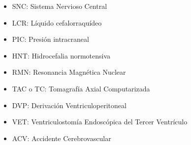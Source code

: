 \begin{itemize}
    \item SNC: Sistema Nervioso Central
    \item LCR: Líquido cefalorraquídeo
    \item PIC: Presión intracraneal
    \item HNT: Hidrocefalia normotensiva
    \item RMN: Resonancia Magnética Nuclear
    \item TAC o TC: Tomagrafía Axial Computarizada
    \item DVP: Derivación Ventriculoperitoneal
    \item VET: Ventriculostomía Endoscópica del Tercer Ventrículo
    \item ACV: Accidente Cerebrovascular
\end{itemize}